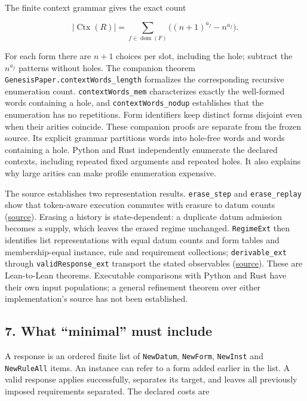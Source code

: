 \documentclass[
  11pt,
]{article}
\begin{document}
The finite context grammar gives the exact count

\[
|\operatorname{Ctx}(R)|
=\sum_{f\in\operatorname{dom}(F)}\bigl((n+1)^{a_f}-n^{a_f}\bigr).
\]

For each form there are \(n+1\) choices per slot, including the hole;
subtract the \(n^{a_f}\) patterns without holes. The companion theorem
\nolinkurl{GenesisPaper.contextWords_length} formalizes the corresponding
recursive enumeration count. \nolinkurl{contextWords_mem} characterizes
exactly the well-formed words containing a hole, and
\nolinkurl{contextWords_nodup} establishes that the enumeration has no
repetitions. Form identifiers keep distinct forms disjoint even when
their arities coincide. These companion proofs are separate from the
frozen source. Its explicit grammar partitions words into hole-free
words and words containing a hole. Python and Rust independently
enumerate the declared contexts, including repeated fixed arguments and
repeated holes. It also explains why large arities can make profile
enumeration expensive.

The source establishes two representation results. \nolinkurl{erase_step}
and \nolinkurl{erase_replay} show that token-aware execution commutes with
erasure to datum counts
(\href{lean4/Derivation/Erasure.lean\#L61}{source}). Erasing a history
is state-dependent: a duplicate datum admission becomes a supply, which
leaves the erased regime unchanged. \nolinkurl{RegimeExt} then identifies
list representations with equal datum counts and form tables and
membership-equal instance, rule and requirement collections;
\nolinkurl{derivable_ext} through \nolinkurl{validResponse_ext} transport
the stated observables (\href{lean4/Derivation/Ext.lean\#L37}{source}).
These are Lean-to-Lean theorems. Executable comparisons with Python and
Rust have their own input populations; a general refinement theorem over
either implementation's source has not been established.

\subsection{7. What ``minimal'' must
include}\label{what-minimal-must-include}

A response is an ordered finite list of \nolinkurl{NewDatum},
\nolinkurl{NewForm}, \nolinkurl{NewInst} and \nolinkurl{NewRuleAll} items. An
instance can refer to a form added earlier in the list. A valid response
applies successfully, separates its target, and leaves all previously
imposed requirements separated. The declared costs are
\end{document}
